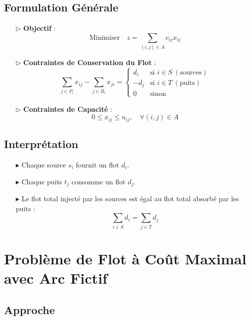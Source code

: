 \documentclass{report}
\begin{document}
\begin{multicols*}{2}
    \subsection*{Formulation Générale}
        \begin{itemize}
            \item[$\rhd$] \textbf{Objectif} :
            \[%
            \text{Minimiser} \quad z = \sum_{(i,j) \in A} c_{ij} x_{ij}
            \]%
            \item[$\rhd$] \textbf{Contraintes de Conservation du Flot} :
            \[%
            \sum_{j \in P_i} x_{ij} - \sum_{j \in B_i} x_{ji} =
                \begin{cases}
                     d_i & \text{si } i \in S \ (\text{sources}) \\
                    -d_j & \text{si } i \in T \ (\text{puits}) \\
                      0 & \text{sinon}
                \end{cases}
            \]%
            \item[$\rhd$] \textbf{Contraintes de Capacité} :
            \[%
            0 \leq x_{ij} \leq u_{ij}, \quad \forall (i,j) \in A
            \]%
        \end{itemize}

        \subsection*{Interprétation}

        \begin{itemize}
            \item[$\blacktriangleright$] Chaque source \( s_i \) fournit un flot \( d_i \).
            \item[$\blacktriangleright$] Chaque puits \( t_j \) consomme un flot \( d_j \).
            \item[$\blacktriangleright$] Le flot total injecté par les sources est 
                                    égal au flot total absorbé par les puits :
            \[%
            \sum_{i \in S} d_i = \sum_{j \in T} d_j
            \]%
        \end{itemize}

\section*{Problème de Flot à Coût Maximal avec Arc Fictif}
    \subsection*{Approche}


\end{multicols*}
\end{document}
